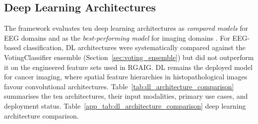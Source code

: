 \subsection{Deep Learning Architectures}
\label{app:sec5_dl_arch}


The framework evaluates ten deep learning architectures as \textit{compared models} for EEG domains and as the \textit{best-performing model} for imaging domains . For EEG-based classification, DL architectures were systematically compared against the VotingClassifier ensemble (Section~\ref{sec:voting_ensemble}) but did not outperform it on the engineered feature sets used in RGAIG. DL remains the deployed model for cancer imaging, where spatial feature hierarchies in histopathological images favour convolutional architectures. Table~\ref{tab:dl_architecture_comparison} summarises the ten architectures, their input modalities, primary use cases, and deployment status.
\noindent Table~\ref{app_tab:dl_architecture_comparison} deep learning architecture comparison.

